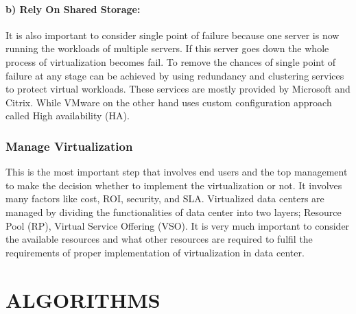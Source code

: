 \documentclass[12pt,a4paper]{report}
\begin{document}
\subsubsection{b) Rely On Shared Storage:}
 It is also important to consider single point of failure because one server is now running the workloads of multiple servers. If this server goes down the whole process of virtualization becomes fail. To remove the chances of single point of failure at any stage can be achieved by using redundancy and clustering services to protect virtual workloads. These services are mostly provided by Microsoft and Citrix. While VMware on the other hand uses custom configuration approach called High availability (HA).


\subsection{Manage Virtualization}
This is the most important step that involves end users and the top management to make the decision whether to implement the virtualization or not. It involves many factors like cost, ROI, security, and SLA. Virtualized data centers are managed by dividing the functionalities of data center into two layers; Resource Pool (RP), Virtual Service Offering (VSO).
  It is very much important to consider the available resources and what other resources are required to fulfil the requirements of proper implementation of virtualization in data center.








\chapter{ALGORITHMS }
\end{document}
